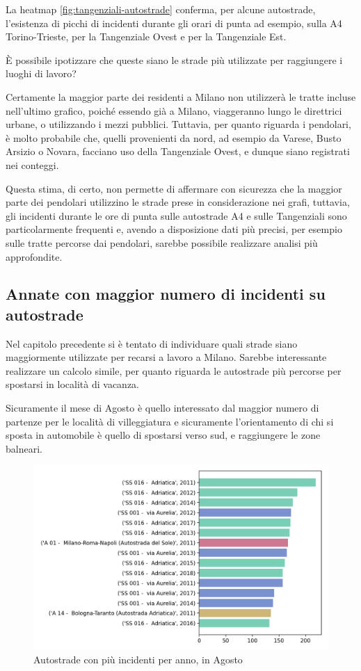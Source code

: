 \documentclass[a4paper,12pt]{report}
\begin{document}
La heatmap \ref{fig:tangenziali-autostrade} conferma, per alcune autostrade, 
l'esistenza di picchi di incidenti durante gli orari di punta ad esempio, 
sulla A4 Torino-Trieste, 
per la Tangenziale Ovest e per la Tangenziale Est. 

\`E possibile ipotizzare che queste siano le strade più utilizzate per 
raggiungere i luoghi di lavoro? 

Certamente la maggior parte dei residenti a Milano non utilizzerà le tratte incluse 
nell'ultimo grafico, poiché essendo già a Milano, 
viaggeranno lungo le direttrici urbane, o utilizzando i mezzi pubblici. 
Tuttavia, per quanto riguarda i pendolari, è molto probabile che, quelli provenienti 
da nord, ad esempio da Varese, Busto Arsizio o Novara, 
facciano uso della Tangenziale Ovest, 
e dunque siano registrati nei conteggi. 

Questa stima, di certo, non permette di affermare con sicurezza 
che la maggior parte dei pendolari utilizzino le strade prese in considerazione 
nei grafi, 
tuttavia, gli incidenti durante le ore di punta sulle autostrade A4 e sulle 
Tangenziali sono particolarmente frequenti e, avendo a disposizione dati più 
precisi, per esempio sulle tratte percorse dai pendolari, sarebbe possibile 
realizzare analisi più approfondite. 

\subsection{Annate con maggior numero di incidenti su autostrade}

Nel capitolo precedente si è tentato di individuare quali strade siano maggiormente 
utilizzate per recarsi a lavoro a Milano. 
Sarebbe interessante realizzare un calcolo simile, per quanto riguarda le autostrade 
più percorse per spostarsi in località di vacanza. 

Sicuramente il mese di Agosto è quello interessato dal maggior numero 
di partenze per le località di villeggiatura e sicuramente l'orientamento 
di chi si sposta in automobile è quello di spostarsi verso sud, 
e raggiungere le zone balneari. 

\begin{figure}
    \includegraphics[width=\linewidth]{../src/incidenti/incidenti_aci/agosto/autostrade_anno_agosto.png}
    \caption{Autostrade con più incidenti per anno, in Agosto}
    \label{fig:autostrade-anno-agosto}
\end{figure}
\end{document}
